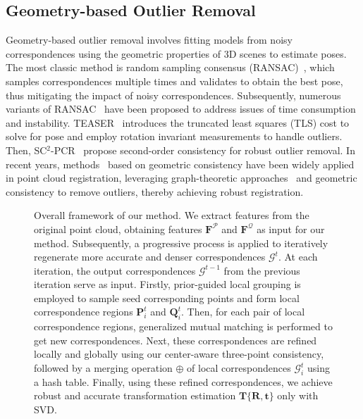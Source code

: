 \subsection{Geometry-based Outlier Removal}
Geometry-based outlier removal involves fitting models from noisy correspondences using the geometric properties of 3D scenes to estimate poses. The most classic method is random sampling consensus (RANSAC)~\cite{fischler1981random}, which 
samples correspondences multiple times and validates to 
obtain the best pose, thus mitigating the impact of noisy correspondences. Subsequently, numerous variants of RANSAC~\cite{barath2018graph, barath2022space, chum2008optimal, schnabel2007efficient} have been proposed to address issues 
of time consumption and instability. TEASER~\cite{yang2020teaser} introduces the truncated least squares (TLS) cost to solve for pose and employ rotation invariant measurements to handle outliers. Then, SC$^2$-PCR~\cite{chen2022sc2, chen2023sc2} propose second-order consistency for robust outlier removal. In recent years, methods~\cite{zhang20233d, yang2023mutual} based on 
geometric consistency have been widely applied in point cloud registration, leveraging graph-theoretic approaches~\cite{eppstein2010listing} and geometric consistency to 
remove outliers, thereby achieving robust registration.

\begin{figure*}[t]
    \caption{
       Overall framework of our method.
       We extract features from the original point cloud, 
       obtaining features $\mathbf{{F} }^{\mathcal{P}}$ and $\mathbf{{F} }^{\mathcal{Q}}$ 
       as input for our method. 
       Subsequently, a progressive 
       process is applied to iteratively regenerate more accurate and denser 
       correspondences $\mathcal{{G}}^{t}$. At each iteration, the output correspondences $\mathcal{{G}}^{t-1}$ from the previous 
       iteration serve as input. Firstly, prior-guided local grouping is employed to sample 
       seed corresponding points and form local correspondence regions 
       $\mathbf{P}^{t}_i$ and $\mathbf{Q}^{t}_i$. Then, for each pair of local correspondence regions, 
       generalized mutual matching is performed to get new correspondences. Next, these correspondences are refined locally and globally using our center-aware three-point consistency, 
       followed by a merging operation $\oplus$ of local correspondences $\mathcal{{G}}^{t}_{i}$ using a hash table.
       Finally, using these refined correspondences,
       we achieve robust and accurate transformation estimation $\mathbf T\{\mathbf R,\mathbf t\}$ only with SVD.
       }
    \label{fig1}
 \end{figure*}

